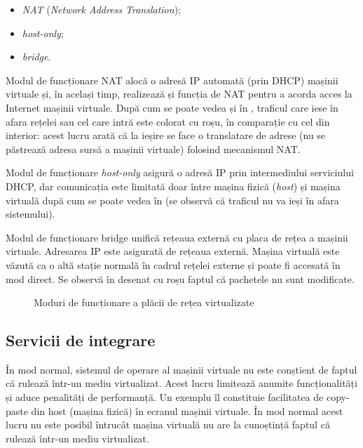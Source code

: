 \begin{itemize}
  \item \textit{NAT} (\textit{Network Address Translation});
  \item \textit{host-only};
  \item \textit{bridge}.
\end{itemize}

Modul de funcționare NAT alocă o adresă IP automată (prin DHCP) mașinii virtuale și, în
același timp, realizează și funcția de NAT pentru a acorda acces la Internet
mașinii virtuale. După cum se poate vedea și în
, traficul care iese în afara rețelei sau cel
care intră este colorat cu roșu, în comparație cu cel din interior: acest lucru
arată că la ieșire se face o translatare de adrese (nu se
păstrează adresa sursă a mașinii virtuale) folosind mecanismul NAT.

Modul de funcționare \textit{host-only} asigură o adresă IP prin intermediului
serviciului DHCP, dar comunicația este limitată doar între mașina fizică (\textit{host})
și mașina virtuală după cum se poate vedea în 
(se observă că traficul nu va ieși în afara sistemului).

Modul de funcționare bridge unifică rețeaua externă cu placa de rețea a mașinii
virtuale. Adresarea IP este asigurată de rețeaua externă. Mașina virtuală este
văzută ca o altă stație normală în cadrul rețelei externe și poate fi accesată
în mod direct. Se observă în  desenat cu roșu
faptul că pachetele nu sunt modificate.

\begin{figure}[htbp]
	\centering
	\def\svgwidth{\columnwidth}
	
	\caption{Moduri de funcționare a plăcii de rețea virtualizate}
	\label{fig:vm:net}
\end{figure}

\subsection{Servicii de integrare}
\label{sec:vm:ops:services}

În mod normal, sistemul de operare al mașinii virtuale nu este conștient de
faptul că rulează într-un mediu virtualizat. Acest lucru limitează anumite
funcționalități și aduce penalități de performanță. Un exemplu îl constituie
facilitatea de copy-paste din host (mașina fizică) în ecranul mașinii
virtuale. În mod normal acest lucru nu este posibil întrucât mașina virtuală nu
are la cunoștință faptul că rulează într-un mediu virtualizat.

